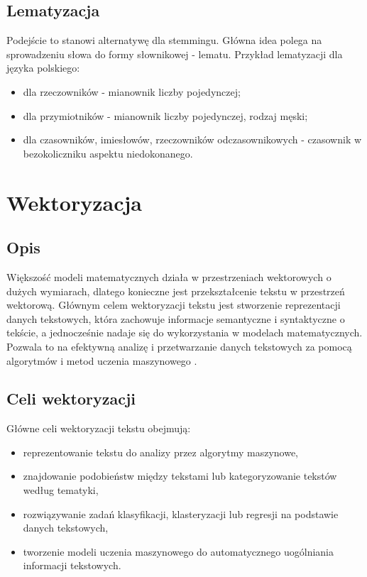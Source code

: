 	\subsection{Lematyzacja}
		Podejście to stanowi alternatywę dla stemmingu. Główna idea polega na sprowadzeniu słowa do formy słownikowej - lematu. Przykład lematyzacji dla języka polskiego:
		\begin{itemize}
			\item dla rzeczowników - mianownik liczby pojedynczej;
			\item dla przymiotników - mianownik liczby pojedynczej, rodzaj męski;
			\item dla czasowników, imiesłowów, rzeczowników odczasownikowych - czasownik w bezokoliczniku aspektu niedokonanego.
		\end{itemize}
		

\section{Wektoryzacja}

	\subsection{Opis}
		Większość modeli matematycznych działa w przestrzeniach wektorowych o dużych wymiarach, dlatego konieczne jest przekształcenie tekstu w przestrzeń wektorową. Głównym celem wektoryzacji tekstu jest stworzenie reprezentacji danych tekstowych, która zachowuje informacje semantyczne i syntaktyczne o tekście, a jednocześnie nadaje się do wykorzystania w modelach matematycznych. Pozwala to na efektywną analizę i przetwarzanie danych tekstowych za pomocą algorytmów i metod uczenia maszynowego \cite{Vectorization}. 

	\subsection{Celi wektoryzacji}
		Główne celi wektoryzacji tekstu obejmują:
		\begin{itemize}
			\item reprezentowanie tekstu do analizy przez algorytmy maszynowe,
			\item znajdowanie podobieństw między tekstami lub kategoryzowanie tekstów według tematyki,
			\item rozwiązywanie zadań klasyfikacji, klasteryzacji lub regresji na podstawie danych tekstowych,
			\item tworzenie modeli uczenia maszynowego do automatycznego uogólniania informacji tekstowych.
		\end{itemize}

